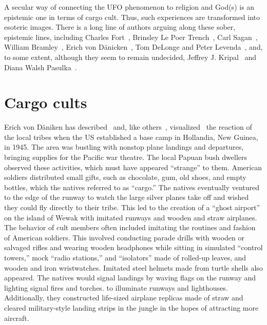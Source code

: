 A secular way of connecting the UFO phenomenon to religion and God(s) is an epistemic one in terms of cargo cult.
Thus, such experiences are transformed into esoteric images.
There is a long line of authors arguing along these sober, epistemic lines, including
Charles Fort~\cite{FortBotD},
Brinsley Le Poer Trench~\cite{lePoerTrench1961Jan},
Carl Sagan~\cite[Section~5, pp.~495,496]{Sagan_1963},
William Bramley~\cite{Bramley1993Mar},
Erich von D\"anicken~\cite{vonDaeniken2019Jun,vonDaenikenCC},
Tom De{L}onge and Peter  Levenda~\cite{DeLongeLevenda-Gods,DeLongeLevenda-Men}, 
and, to some extent, although they seem to remain undecided,
Jeffrey J. Kripal~\cite{Kripal2011Nov,Kripal2021Jun} and 
Diana Walsh Pasulka~\cite{Pasulka2019Feb}. 




\section{Cargo cults}
\label{2023-UFO-part-Speculation-cargo-cults-gen} %

Erich von D\"aniken has described~\cite{vonDaeniken2019Jun,vonDaenikenCC} and, like others~\cite{MondoCane1962},
visualized~\cite{vonDaeniken1970}
the reaction of the local tribes when the US established a base camp in Hollandia, New Guinea, in 1945.
The area was bustling with nonstop plane landings and departures, bringing supplies for the Pacific war theatre.
The local Papuan bush dwellers observed these activities, which must have appeared ``strange'' to them.
American soldiers distributed small gifts, such as chocolate, gum, old shoes, and empty bottles, which the natives referred to as ``cargo.''
The natives eventually ventured to the edge of the runway to watch the large silver planes take off and wished they could fly directly to their tribe.
This led to the creation of a ``ghost airport'' on the island of Wewak with imitated runways and wooden and straw airplanes.
The behavior of cult members often included imitating the routines and fashion of American soldiers.
This involved conducting parade drills with wooden or salvaged rifles and wearing wooden headphones while sitting in
simulated ``control towers,'' mock ``radio stations,'' and ``isolators''
made of rolled-up leaves, and wooden and iron wristwatches.
Imitated steel helmets made from turtle shells also appeared.
The natives would signal landings by waving flags on the runway and lighting signal fires and torches.
to illuminate runways and lighthouses.
Additionally, they constructed life-sized airplane replicas made of straw and cleared military-style landing strips
in the jungle in the hopes of attracting more aircraft.

